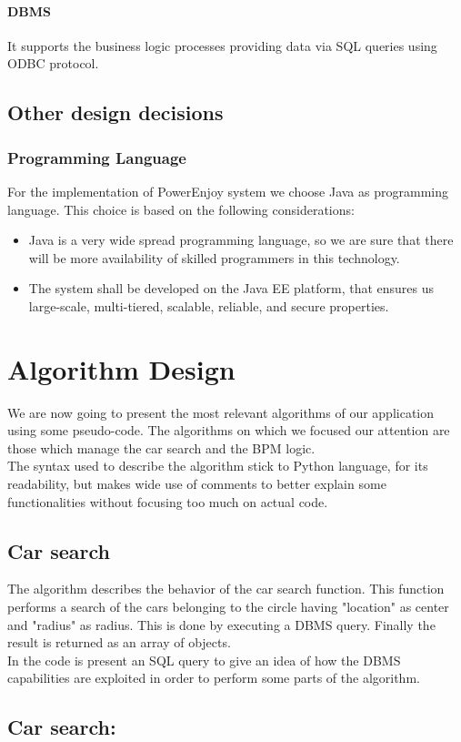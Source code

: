 \documentclass[english]{article}
\newcommand{\code}[2]{
  \hrulefill
  \subsection*{#1}
  
  \vspace{2em}
}
\begin{document}
	\paragraph{DBMS}
	It supports the business logic processes providing data via SQL queries using ODBC protocol.
	\subsection{Other design decisions}
		\subsubsection{Programming Language}
			 For the implementation of PowerEnjoy system we choose Java as programming language. This choice is based on the following considerations:
			\begin{itemize}
				\item{Java is a very wide spread programming language, so we are sure that there will be more availability of skilled programmers in this technology.}
				\item{The system shall be developed on the Java EE platform, that ensures us large-scale, multi-tiered, scalable, reliable, and secure properties.}
			\end{itemize}
\section{Algorithm Design} %
	We are now going to present the most relevant algorithms of our application using some pseudo-code. The algorithms on which we focused our attention are those which manage the car search and the BPM logic.\\
	The syntax used to describe the algorithm stick to Python language, for its readability, but makes wide use of comments to better explain some functionalities without focusing too much on actual code.
	\subsection{Car search}
		The algorithm describes the behavior of the car search function. This function performs a search of the cars belonging to the circle having "location" as center and "radius" as radius. This is done by executing a DBMS query. Finally the result is returned as an array of objects.\\
		In the code is present an SQL query to give an idea of how the DBMS capabilities are exploited in order to perform some parts of the algorithm.
		\clearpage
		\code{Car search:}{./Algorithm/CarSearch/car_search.py}
\end{document}
